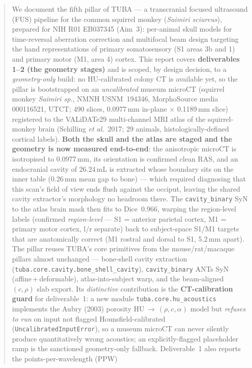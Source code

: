 \documentclass{compactarticle}
\begin{document}
\begin{abstract}
We document the fifth pillar of TUBA --- a transcranial focused
ultrasound (FUS) pipeline for the common squirrel monkey
(\emph{Saimiri sciureus}), prepared for NIH R01 EB037345 (Aim~3):
per-animal skull models for time-reversal aberration correction and
multifocal beam design targeting the hand representations of primary
somatosensory (S1 areas 3b and 1) and primary motor (M1, area 4)
cortex. This report covers \textbf{deliverables 1--2 (the geometry
stages)} and is scoped, by design decision, to a \emph{geometry-only}
build: no HU-calibrated colony CT is available yet, so the pillar is
bootstrapped on an \emph{uncalibrated} museum microCT
(squirrel monkey \emph{Saimiri sp.}, NMNH USNM~194346, MorphoSource
media 000116521, UTCT; 490 slices, 0.0977\,mm in-plane $\times$
0.1189\,mm slice) registered to the VALiDATe29 multi-channel MRI
atlas of the squirrel-monkey brain (Schilling \emph{et al.}\ 2017;
29 animals, histologically-defined cortical labels). \textbf{Both the
skull and the atlas are staged and the geometry is now measured
end-to-end}: the anisotropic microCT is isotropised to 0.0977\,mm, its
orientation is confirmed clean RAS, and an endocranial cavity of
26.24\,mL is extracted whose boundary sits on the inner table
(0.26\,mm mean gap to bone) --- which required diagnosing that this
scan's field of view ends flush against the occiput, leaving the shared
cavity extractor's morphology no headroom there. The
\texttt{cavity\_binary} SyN to the atlas
brain mask then fits to Dice~0.966, warping the region-level labels
(confirmed \emph{region-level} --- S1 = anterior parietal cortex,
M1 = primary motor cortex, l/r separate) back to subject-space S1/M1
targets that are anatomically correct (M1 rostral and dorsal to S1,
5.2\,mm apart). The pillar reuses
TUBA's core primitives from the mouse/rat/macaque pillars almost
unchanged --- bone-shell cavity extraction
(\texttt{tuba.core.cavity.bone\_shell\_cavity}), \texttt{cavity\_binary}
ANTs SyN (affine\,+\,deformable), atlas-into-subject warp, and the
beam-aligned $(c,\rho)$ slab export. Its \emph{distinctive}
contribution is the \textbf{CT-calibration guard} for
deliverable~1: a new module \texttt{tuba.core.hu\_acoustics} implements
the Aubry (2003) porosity HU$\,\to\,(\rho,c,\alpha)$ model but
\emph{refuses to run} on input not flagged Hounsfield-calibrated
(\texttt{UncalibratedInputError}), so a museum microCT can never
silently produce quantitatively wrong acoustics; an
explicitly-flagged placeholder ramp is the sanctioned geometry-only
fallback. Deliverable~1 also reports the points-per-wavelength (PPW)

\end{abstract}
\end{document}
